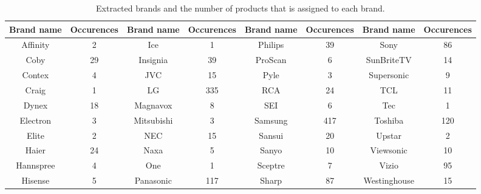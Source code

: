 \begin{table}
    \centering
    \caption{Extracted brands and the number of products that is assigned to each brand.}
    \begin{tabular}{ |c|c|c|c|c|c|c|c| } 
     \hline
     Brand name & Occurences & Brand name & Occurences & Brand name & Occurences & Brand name & Occurences\\ 
     \hline

    Affinity &      2 &         Ice &      1 &  Philips &     39 &          Sony &     86 \\ \hline
    Coby &     29 &    Insignia &     39 &  ProScan &      6 &    SunBriteTV &     14 \\ \hline
    Contex &      4 &         JVC &     15 &     Pyle &      3 &    Supersonic &      9 \\ \hline
    Craig &      1 &          LG &    335 &      RCA &     24 &           TCL &     11 \\ \hline
    Dynex &     18 &    Magnavox &      8 &      SEI &      6 &           Tec &      1 \\ \hline
    Electron &      3 &  Mitsubishi &      3 &  Samsung &    417 &       Toshiba &    120 \\ \hline
    Elite &      2 &         NEC &     15 &   Sansui &     20 &        Upstar &      2 \\ \hline
    Haier &     24 &        Naxa &      5 &    Sanyo &     10 &     Viewsonic &     10 \\ \hline
    Hannspree &      4 &         One &      1 &  Sceptre &      7 &         Vizio &     95 \\ \hline
    Hisense &      5 &   Panasonic &    117 &    Sharp &     87 &  Westinghouse &     15 \\ \hline
    \end{tabular}
    \label{table:brands_in_data}
\end{table}

